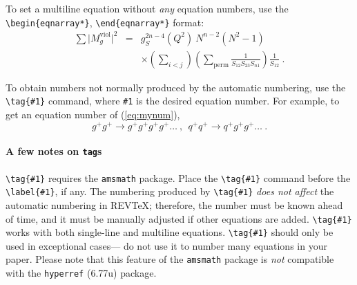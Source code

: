 \documentclass[%
 preprint, linenumbers,
 amsmath,amssymb,
 aps, physrev,
pra,
]{revtex4-2}
\begin{document}
To set a multiline equation without \emph{any} equation
numbers, use the \verb+\begin{eqnarray*}+,
\verb+\end{eqnarray*}+ format:
\begin{eqnarray*}
\sum \vert M^{\text{viol}}_g \vert ^2&=&g^{2n-4}_S(Q^2)~N^{n-2}
        (N^2-1)\\
 & &\times \left( \sum_{i<j}\right)
 \left(
  \sum_{\text{perm}}\frac{1}{S_{12}S_{23}S_{n1}}
 \right)
 \frac{1}{S_{12}}~.
\end{eqnarray*}

To obtain numbers not normally produced by the automatic numbering,
use the \verb+\tag{#1}+ command, where \verb+#1+ is the desired
equation number. For example, to get an equation number of
(\ref{eq:mynum}),
\begin{equation}
g^+g^+ \rightarrow g^+g^+g^+g^+ \dots ~,~~q^+q^+\rightarrow
q^+g^+g^+ \dots ~. \tag{2.6$'$}\label{eq:mynum}
\end{equation}

\paragraph{A few notes on \texttt{tag}s} 
\verb+\tag{#1}+ requires the \texttt{amsmath} package. 
Place the \verb+\tag{#1}+ command before the \verb+\label{#1}+, if any. 
The numbering produced by \verb+\tag{#1}+ \textit{does not affect} 
the automatic numbering in REV\TeX; 
therefore, the number must be known ahead of time, 
and it must be manually adjusted if other equations are added. 
\verb+\tag{#1}+ works with both single-line and multiline equations. 
\verb+\tag{#1}+ should only be used in exceptional cases---%
do not use it to number many equations in your paper. 
Please note that this feature of the \texttt{amsmath} package
is \emph{not} compatible with the \texttt{hyperref} (6.77u) package.
\end{document}

